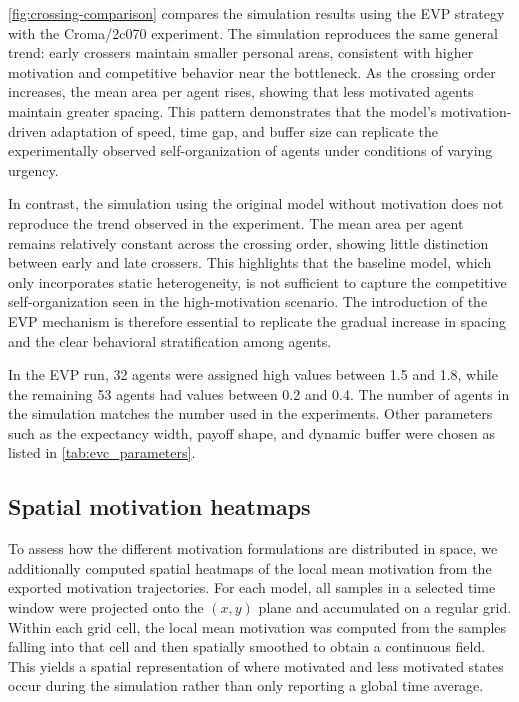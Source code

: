 \documentclass[pdflatex,sn-mathphys-num]{sn-jnl}%
\theoremstyle{thmstyleone}%
\theoremstyle{thmstyletwo}%
\theoremstyle{thmstylethree}%
\begin{document}
\cref{fig:crossing-comparison} compares the simulation results using the EVP strategy with the Croma/2c070 experiment. The simulation reproduces the same general trend: early crossers maintain smaller personal areas, consistent with higher motivation and competitive behavior near the bottleneck. As the crossing order increases, the mean area per agent rises, showing that less motivated agents maintain greater spacing. This pattern demonstrates that the model’s motivation-driven adaptation of speed, time gap, and buffer size can replicate the experimentally observed self-organization of agents under conditions of varying urgency.

In contrast, the simulation using the original model without motivation does not reproduce the trend observed in the experiment. The mean area per agent remains relatively constant across the crossing order, showing little distinction between early and late crossers. This highlights that the baseline model, which only incorporates static heterogeneity, is not sufficient to capture the competitive self-organization seen in the high-motivation scenario. The introduction of the EVP mechanism is therefore essential to replicate the gradual increase in spacing and the clear behavioral stratification among agents.

In the EVP run, 32 agents were assigned high values between 1.5 and 1.8, while the remaining 53 agents had values between 0.2 and 0.4.
The number of agents in the simulation matches the number used in the experiments. Other parameters such as the expectancy width, payoff shape, and dynamic buffer were chosen as listed in \cref{tab:evc_parameters}.

\subsection{Spatial motivation heatmaps}
To assess how the different motivation formulations are distributed in space, we additionally computed spatial heatmaps of the local mean motivation from the exported motivation trajectories. For each model, all samples in a selected time window were projected onto the $(x,y)$ plane and accumulated on a regular grid. Within each grid cell, the local mean motivation was computed from the samples falling into that cell and then spatially smoothed to obtain a continuous field. This yields a spatial representation of where motivated and less motivated states occur during the simulation rather than only reporting a global time average.
\end{document}
